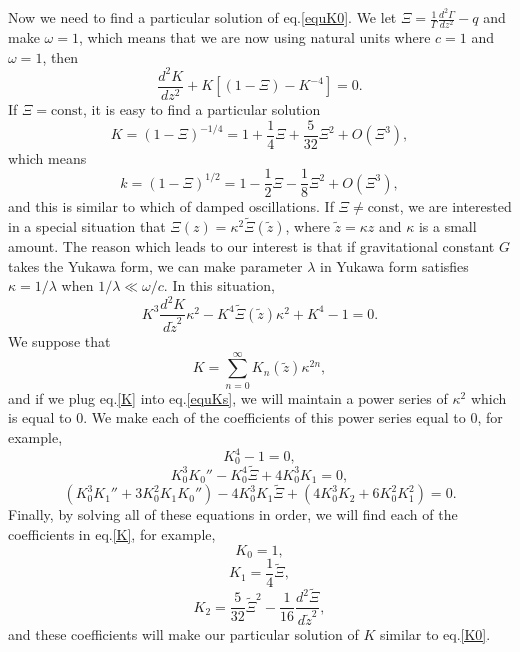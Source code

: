 \documentclass[
    jor,
    amsmath,amssymb,preprint,
    superscriptaddress,
]{revtex4-2}
\begin{document}
Now we need to find a particular solution of eq.\eqref{equK0}. We let $\Xi=\frac{1}{\Gamma}\frac{d^2\Gamma}{d z^2}-q$ and make $\omega=1$, which means that we are now using natural units where $c=1$ and $\omega=1$, then
\begin{equation}\label{equK}
    \frac{d^2 K}{d z^2}+K[(1-\Xi)-K^{-4}]=0.
\end{equation}
If $\Xi=\text{const}$, it is easy to find a particular solution
\begin{equation}\label{K0}
    K=(1-\Xi)^{-1/4}=1+\frac{1}{4}\Xi+\frac{5}{32}\Xi^2+O(\Xi^3),
\end{equation}
which means
\begin{equation}
    k=(1-\Xi)^{1/2}=1-\frac{1}{2}\Xi-\frac{1}{8}\Xi^2+O(\Xi^3),
\end{equation}
and this is similar to which of damped oscillations. If $\Xi\neq\text{const}$, we are interested in a special situation that $\Xi(z)=\kappa^2\tilde{\Xi}(\tilde{z})$, where $\tilde{z}=\kappa z$ and $\kappa$ is a small amount. The reason which leads to our interest is that if gravitational constant $G$ takes the Yukawa form, we can make parameter $\lambda$ in Yukawa form satisfies $\kappa=1/\lambda$ when $1/\lambda\ll\omega/c$. In this situation,
\begin{equation}\label{equKs}
    K^3\frac{d^2 K}{d \tilde{z}^2}\kappa^2-K^4\tilde{\Xi}(\tilde{z})\kappa^2+K^4-1=0.
\end{equation}
We suppose that
\begin{equation}\label{K}
    K=\sum_{n=0}^\infty K_n(\tilde{z})\kappa^{2n},
\end{equation}
and if we plug eq.\eqref{K} into eq.\eqref{equKs}, we will maintain a power series of $\kappa^2$ which is equal to $0$. We make each of the coefficients of this power series equal to $0$, for example,
\begin{equation}
    K_0^4-1=0,
\end{equation}
\begin{equation}
    K_0^3K_0''-K_0^4\tilde{\Xi}+4K_0^3K_1=0,
\end{equation}
\begin{equation}
    (K_0^3K_1''+3K_0^2K_1K_0'')-4K_0^3K_1\tilde{\Xi}+(4K_0^3K_2+6K_0^2K_1^2)=0.
\end{equation}
Finally, by solving all of these equations in order, we will find each of the coefficients in eq.\eqref{K}, for example,
\begin{equation}
    K_0=1,
\end{equation}
\begin{equation}
    K_1=\frac{1}{4}\tilde{\Xi},
\end{equation}
\begin{equation}
    K_2=\frac{5}{32}\tilde{\Xi}^2-\frac{1}{16}\frac{d^2\tilde{\Xi}}{d\tilde{z}^2},
\end{equation}
and these coefficients will make our particular solution of $K$ similar to eq.\eqref{K0}.


\end{document}
